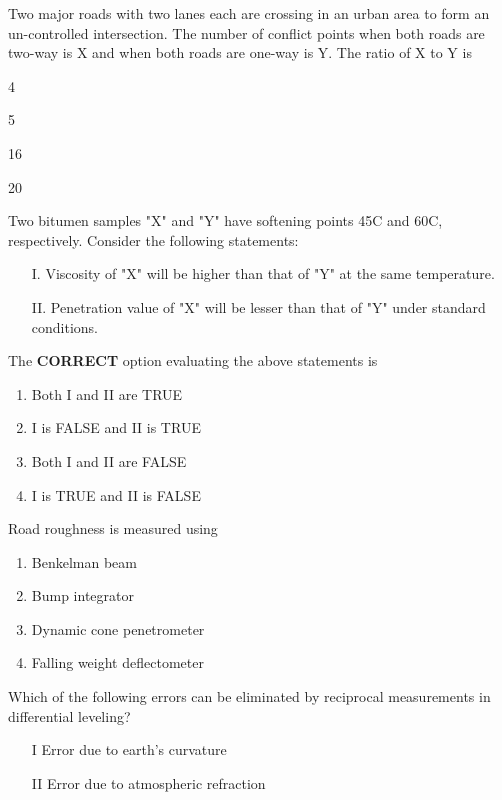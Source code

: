 \item Two major roads with two lanes each are crossing in an urban area to form an un-controlled intersection. The number of conflict points when both roads are two-way is X and when both roads are one-way is Y. The ratio of X to Y is

\begin{enumerate}
\begin{multicols}{4}
    \item 4
    \item 5
    \item 16
    \item 20
    \end{multicols}
\end{enumerate}

\item Two bitumen samples "X" and "Y" have softening points 45\degree C and 60\degree C, respectively. Consider the following statements:

\begin{enumerate}
    \item[I.] Viscosity of "X" will be higher than that of "Y" at the same temperature.
    \item[II.] Penetration value of "X" will be lesser than that of "Y" under standard conditions.
\end{enumerate}

The \textbf{CORRECT} option evaluating the above statements is

\begin{enumerate}
    \item Both I and II are TRUE
    \item I is FALSE and II is TRUE
    \item Both I and II are FALSE
    \item I is TRUE and II is FALSE
\end{enumerate}

\item  Road roughness is measured using

\begin{enumerate}
    \item Benkelman beam
    \item Bump integrator
    \item Dynamic cone penetrometer
    \item Falling weight deflectometer
\end{enumerate}

\item Which of the following errors can be eliminated by reciprocal measurements in differential leveling?\\
        \begin{enumerate}
            \item[I] Error due to earth's curvature
            \item[II] Error due to atmospheric refraction
        \end{enumerate}

